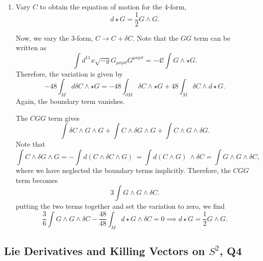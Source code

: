\begin{enumerate}[label=\textbf{\roman*)}]
    \item Vary $C$ to obtain the equation of motion for the 4-form,
    \begin{equation}
        d\star G = \frac{1}{2}G\wedge G.
    \end{equation}
    \begin{solution}
        Now, we vary the 3-form, $C\to C + \delta C$. Note that the $GG$ term can be written as 
        \begin{equation}
            \int d^{11}x\sqrt{-g}G_{\mu\nu\rho\sigma}G^{\mu\nu\rho\sigma}=-4!\int G\wedge \star G.
        \end{equation}
        Therefore, the variation is given by
        \begin{equation}
            -48\int_M d\delta C \wedge \star G = -48\int_{\partial M} \delta C \wedge \star G + 48\int_M\delta C\wedge d \star G.
        \end{equation}
        Again, the boundary term vanishes.

        The $CGG$ term gives
        \begin{equation}
            \int\delta C\wedge G \wedge G + \int C\wedge \delta G \wedge G + \int C\wedge G \wedge \delta G.
        \end{equation}
        Note that
        \begin{equation}
            \int C\wedge \delta G \wedge G = -\int d(C\wedge \delta C \wedge G)\ = \int d(C\wedge G)\ \wedge \delta C =  \int G\wedge G \wedge  \delta C,
        \end{equation}
        where we have neglected the boundary terms implicitly.
        Therefore, the $CGG$ term becomes
        \begin{equation}
            3\int G\wedge G \wedge  \delta C.
        \end{equation}
        putting the two terms together and set the variation to zero, we find
        \begin{equation}
            \frac{3}{6}\int G\wedge G \wedge  \delta C -\frac{48}{48}\int_M d \star G\wedge\delta C = 0 \implies d \star G = \frac{1}{2}G\wedge G.
        \end{equation}
    \end{solution}
\end{enumerate}


\subsection{Lie Derivatives and Killing Vectors on $S^2$, Q4}

